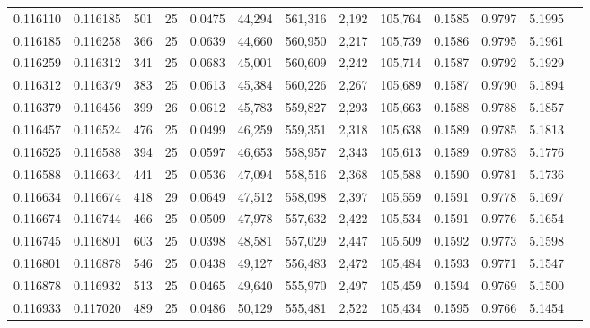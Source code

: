 \begin{tabular}{rrrrrrrrrrrrr}
0.116110 & 0.116185 & 501 &  25 &                                     0.0475 &  44,294 & 561,316 &   2,192 & 105,764 & 0.1585 & 0.9797 & 5.1995 \\
0.116185 & 0.116258 & 366 &  25 &                                     0.0639 &  44,660 & 560,950 &   2,217 & 105,739 & 0.1586 & 0.9795 & 5.1961 \\
0.116259 & 0.116312 & 341 &  25 &                                     0.0683 &  45,001 & 560,609 &   2,242 & 105,714 & 0.1587 & 0.9792 & 5.1929 \\
0.116312 & 0.116379 & 383 &  25 &                                     0.0613 &  45,384 & 560,226 &   2,267 & 105,689 & 0.1587 & 0.9790 & 5.1894 \\
0.116379 & 0.116456 & 399 &  26 &                                     0.0612 &  45,783 & 559,827 &   2,293 & 105,663 & 0.1588 & 0.9788 & 5.1857 \\
0.116457 & 0.116524 & 476 &  25 &                                     0.0499 &  46,259 & 559,351 &   2,318 & 105,638 & 0.1589 & 0.9785 & 5.1813 \\
0.116525 & 0.116588 & 394 &  25 &                                     0.0597 &  46,653 & 558,957 &   2,343 & 105,613 & 0.1589 & 0.9783 & 5.1776 \\
0.116588 & 0.116634 & 441 &  25 &                                     0.0536 &  47,094 & 558,516 &   2,368 & 105,588 & 0.1590 & 0.9781 & 5.1736 \\
0.116634 & 0.116674 & 418 &  29 &                                     0.0649 &  47,512 & 558,098 &   2,397 & 105,559 & 0.1591 & 0.9778 & 5.1697 \\
0.116674 & 0.116744 & 466 &  25 &                                     0.0509 &  47,978 & 557,632 &   2,422 & 105,534 & 0.1591 & 0.9776 & 5.1654 \\
0.116745 & 0.116801 & 603 &  25 &                                     0.0398 &  48,581 & 557,029 &   2,447 & 105,509 & 0.1592 & 0.9773 & 5.1598 \\
0.116801 & 0.116878 & 546 &  25 &                                     0.0438 &  49,127 & 556,483 &   2,472 & 105,484 & 0.1593 & 0.9771 & 5.1547 \\
0.116878 & 0.116932 & 513 &  25 &                                     0.0465 &  49,640 & 555,970 &   2,497 & 105,459 & 0.1594 & 0.9769 & 5.1500 \\
0.116933 & 0.117020 & 489 &  25 &                                     0.0486 &  50,129 & 555,481 &   2,522 & 105,434 & 0.1595 & 0.9766 & 5.1454 \\

\end{tabular}
